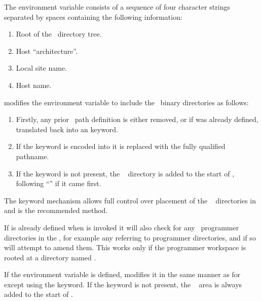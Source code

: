 The  environment variable consists of a sequence of four
character strings separated by spaces containing the following information:

\begin{enumerate}
\item
   Root of the \aipspp\ directory tree.

\item
   Host ``architecture''.

\item
   Local site name.

\item
   Host name.

\end{enumerate}

 modifies the  environment variable to include the
\aipspp\ binary directories as follows:

\begin{enumerate}

\item
   Firstly, any prior \aipspp\ path definition is either removed, or if
    was already defined, translated back into an
    keyword.

\item
   If the keyword  is encoded into  it is replaced
   with the fully qualified pathname.

\item
   If the  keyword is not present, the \aipspp\ 
   directory is added to the start of , following ``'' if
   it came first.

\end{enumerate}

The keyword mechanism allows full control over placement of the \aipspp\ 
 directories in  and is the recommended method.

If  is already defined when  is invoked it will
also check for any \aipspp\ programmer directories in the \code{PATH}, for
example any referring to programmer \file{bin} directories, and if so will
attempt to amend them.  This works only if the programmer workspace is rooted
at a directory named \file{aips++}.

If the  environment variable is defined,  modifies
it in the same manner as for \code{PATH} except using the 
keyword.  If the \code{aips\_doc} keyword is not present, the \aipspp\ 
 area is always added to the start of .

